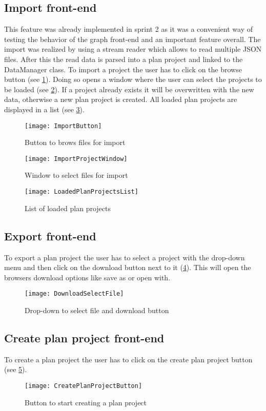 \subsection{Import front-end}
This feature was already implemented in sprint 2 as it was a convenient way of testing the behavior of the graph front-end and an important feature overall. The import was realized by using a stream reader which allows to read multiple JSON files. After this the read data is parsed into a plan project and linked to the DataManager class. To import a project the user has to click on the browse button (see \ref{importButton}). Doing so opens a window where the user can select the projects to be loaded (see \ref{importWindow}). If a project already exists it will be overwritten with the new data, otherwise a new plan project is created. All loaded plan projects are displayed in a list (see \ref{loadedPlanProjects}).
\begin{figure}[H]
	\centering
	\texttt{[image: ImportButton]}
	\caption{Button to brows files for import}
	\label{importButton}
\end{figure}
\begin{figure}[H]
	\centering
	\texttt{[image: ImportProjectWindow]}
	\caption{Window to select files for import}
	\label{importWindow}
\end{figure}
\begin{figure}[H]
	\centering
	\texttt{[image: LoadedPlanProjectsList]}
	\caption{List of loaded plan projects}
	\label{loadedPlanProjects}
\end{figure}

\subsection{Export front-end}
To export a plan project the user has to select a project with the drop-down menu and then click on the download button next to it (\ref{downloadSelectFile}). This will open the browsers download options like save as or open with.
\begin{figure}[H]
	\centering
	\texttt{[image: DownloadSelectFile]}
	\caption{Drop-down to select file and download button}
	\label{downloadSelectFile}
\end{figure}

\subsection{Create plan project front-end}
To create a plan project the user has to click on the create plan project button (see \ref{createPlanProjectButton}). 
\begin{figure}[H]
	\centering
	\texttt{[image: CreatePlanProjectButton]}
	\caption{Button to start creating a plan project}
	\label{createPlanProjectButton}
\end{figure}

